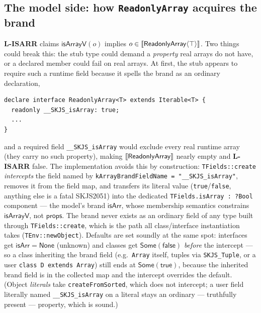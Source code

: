 \documentclass[11pt]{article}
\begin{document}
\subsection{The model side: how \texttt{ReadonlyArray} acquires the
brand}

\textbf{L-ISARR} claims $\mathsf{isArrayV}(o)$ implies
$o \in \llbracket \mathsf{ReadonlyArray}\langle\top\rangle \rrbracket$. Two things could
break this: the stub type could demand a \emph{property} real arrays do
not have, or a declared member could fail on real arrays. At first, the
stub appears to require such a runtime field because it spells the brand
as an ordinary declaration,
\begin{verbatim}
declare interface ReadonlyArray<T> extends Iterable<T> {
  readonly __SKJS_isArray: true;
  ...
}
\end{verbatim}
and a required field \texttt{\_\_SKJS\_isArray} would exclude every real
runtime array (they carry no such property), making
$\llbracket \mathsf{ReadonlyArray} \rrbracket$ nearly empty and \textbf{L-ISARR} false.
The implementation avoids this by construction: \texttt{TFields::create}
\emph{intercepts} the field named by
\texttt{kArrayBrandFieldName = "\_\_SKJS\_isArray"}, removes it from the
field map, and transfers its literal value (\texttt{true}/\texttt{false},
anything else is a fatal SKJS2051) into the dedicated
\texttt{TFields.isArray :\ ?Bool} component — the model's brand
$\mathsf{isArr}$, whose membership semantics constrains
$\mathsf{isArrayV}$, not $\mathsf{props}$. The brand never exists as an
ordinary field of any type built through \texttt{TFields::create}, which
is the path all class/interface instantiation takes
(\texttt{TEnv::newObject}). Defaults are set soundly at the same spot:
interfaces get $\mathsf{isArr} = \mathsf{None}$ (unknown) and classes
get $\mathsf{Some}(\mathsf{false})$ \emph{before} the intercept — so a
class inheriting the brand field (e.g.\ \texttt{Array} itself, tuples
via \texttt{SKJS\_Tuple}, or a user \texttt{class D extends Array})
still ends at $\mathsf{Some}(\mathsf{true})$, because the inherited
brand field is in the collected map and the intercept overrides the
default. (Object \emph{literals} take \texttt{createFromSorted}, which
does not intercept; a user field literally named
\texttt{\_\_SKJS\_isArray} on a literal stays an ordinary — truthfully
present — property, which is sound.)
\end{document}
